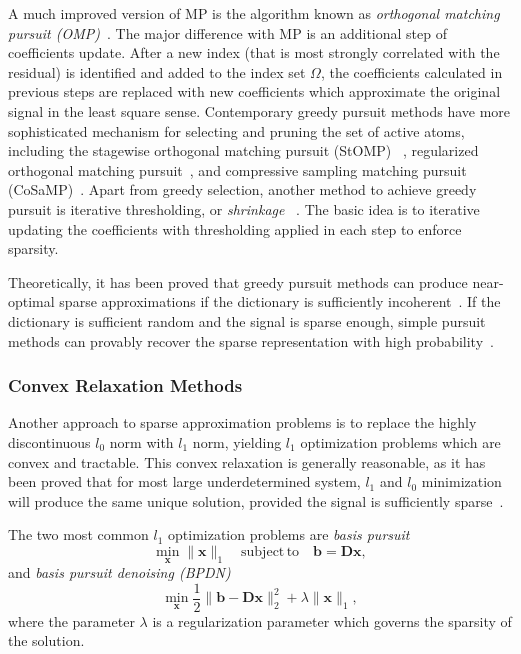 A much improved version of MP is the algorithm known as \emph{orthogonal matching pursuit (OMP)}~\cite{Pati1993}.
The major difference with MP is an additional step of coefficients update. After a new index (that is most strongly
correlated with the residual) is identified and added to the index set $\Omega$,
the coefficients calculated in previous steps are replaced with new coefficients which approximate the original signal
in the least square sense. Contemporary greedy pursuit methods have more sophisticated mechanism for selecting and
pruning the set of active atoms, including the stagewise orthogonal matching pursuit (StOMP)
~\cite{Donoho2012}, regularized orthogonal matching pursuit~\cite{Tropp2007}, and compressive sampling matching
pursuit (CoSaMP)~\cite{Needell2009}. Apart from greedy selection, another method to achieve greedy pursuit is
iterative thresholding, or \emph{shrinkage} ~\cite{Daubechies2004, Blumensath2009}. The basic idea is to
iterative updating the coefficients with thresholding applied in each step to enforce sparsity.

Theoretically, it has been proved that greedy pursuit methods can produce near-optimal sparse approximations
if the dictionary is sufficiently incoherent~\cite{Tropp2004}. If the dictionary is sufficient random and the
signal is sparse enough, simple pursuit methods can provably recover the sparse representation with high probability~\cite{Tropp2007}.


\subsubsection*{Convex Relaxation Methods}
Another approach to sparse approximation problems is to replace the highly discontinuous $l_0$ norm
with $l_1$ norm, yielding $l_1$ optimization problems which are convex and tractable.
This convex relaxation is generally reasonable, as it has been proved that for most large underdetermined system,
$l_1$ and $l_0$ minimization will produce the same unique solution, provided the signal is sufficiently
sparse~\cite{donoho2006most}.

The two most common $l_1$ optimization problems are \emph{basis pursuit}
\begin{equation}
\label{eq:basis-pursuit}
\min_\mathbf{x} \|\mathbf{x}\|_1 \quad \mathrm{subject\,to} \quad \mathbf{b}=\mathbf{D}\mathbf{x},
\end{equation}
and \emph{basis pursuit denoising (BPDN)}
\begin{equation}
\label{eq:bpdn}
\min_\mathbf{x} \frac{1}{2}\|\mathbf{b}-\mathbf{D}\mathbf{x}\|_2^2 + \lambda \|\mathbf{x}\|_1,
\end{equation}
where the parameter $\lambda$ is a regularization parameter which governs the sparsity of the solution.

